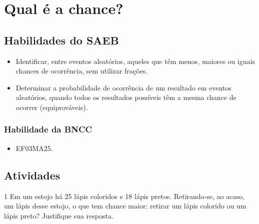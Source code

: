 \chapter{Qual é a chance?}

\section*{Habilidades do SAEB}

\begin{itemize}
\item Identificar, entre eventos aleatórios, aqueles que têm menos, maiores ou
iguais chances de ocorrência, sem utilizar frações.

\item Determinar a probabilidade de ocorrência de um resultado em eventos
aleatórios, quando todos os resultados possíveis têm a mesma chance de
ocorrer (equiprováveis).
\end{itemize}

\subsection{Habilidade da BNCC}

\begin{itemize}
  \item 
 EF03MA25.
\end{itemize}


\pagebreak 

\section*{Atividades}

\num{1} Em um estojo há 25 lápis coloridos e 18 lápis pretos. Retirando-se, ao
acaso, um lápis desse estojo, o que tem chance maior: retirar um lápis
colorido ou um lápis preto? Justifique sua resposta.


